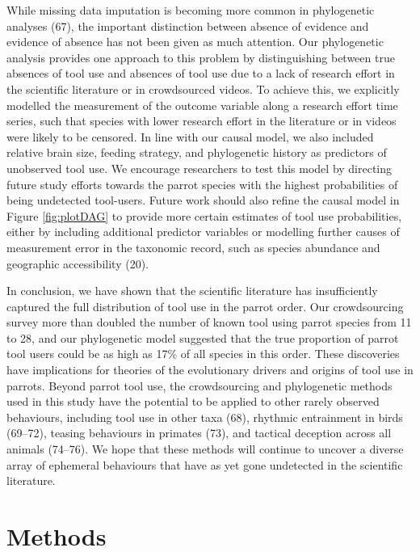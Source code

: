 \documentclass[
  man,floatsintext]{apa6}
\begin{document}
While missing data imputation is becoming more common in phylogenetic
analyses (67), the important distinction between absence of
evidence and evidence of absence has not been given as much attention. Our
phylogenetic analysis provides one approach to this problem by distinguishing
between true absences of tool use and absences of tool use due to a lack of
research effort in the scientific literature or in crowdsourced videos. To
achieve this, we explicitly modelled the measurement of the outcome variable
along a research effort time series, such that species with lower research
effort in the literature or in videos were likely to be censored. In line with
our causal model, we also included relative brain size, feeding strategy, and
phylogenetic history as predictors of unobserved tool use. We encourage
researchers to test this model by directing future study efforts towards the
parrot species with the highest probabilities of being undetected tool-users.
Future work should also refine the causal model in Figure \ref{fig:plotDAG} to
provide more certain estimates of tool use probabilities, either by including
additional predictor variables or modelling further causes of measurement error
in the taxonomic record, such as species abundance and geographic
accessibility (20).

In conclusion, we have shown that the scientific literature has insufficiently
captured the full distribution of tool use in the parrot order. Our
crowdsourcing survey more than doubled the number of known tool using parrot
species from 11 to 28, and our phylogenetic model suggested that the true
proportion of parrot tool users could be as high as 17\% of all species in this
order. These discoveries have implications for theories of the evolutionary
drivers and origins of tool use in parrots. Beyond parrot tool use, the
crowdsourcing and phylogenetic methods used in this study have the potential to
be applied to other rarely observed behaviours, including tool use in other
taxa (68), rhythmic entrainment in birds (69--72), teasing behaviours in primates (73), and
tactical deception across all animals (74--76).
We hope that these methods will continue to uncover a diverse array of ephemeral
behaviours that have as yet gone undetected in the scientific literature.

\hypertarget{methods}{%
\section{Methods}\label{methods}}
\end{document}
